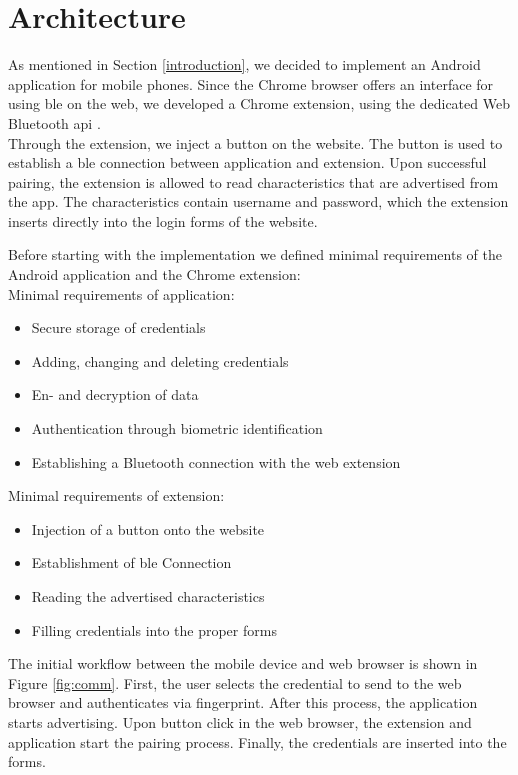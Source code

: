 \section{Architecture} \label{architecture}
As mentioned in Section \ref{introduction}, we decided to implement an Android application for mobile phones. Since the Chrome browser offers an interface for using \gls{ble} on the web, we developed a Chrome extension, using the dedicated Web Bluetooth \gls{api} \cite{WebBTAPI}. \\
Through the extension, we inject a button on the website. The button is used to establish a \gls{ble} connection between application and extension. Upon successful pairing, the extension is allowed to read characteristics that are advertised from the app. The characteristics contain username and password, which the extension inserts directly into the login forms of the website.

\noindent Before starting with the implementation we defined minimal requirements of the Android application and the Chrome extension: \\

\noindent Minimal requirements of application:
\begin{itemize}
\item Secure storage of credentials
\item Adding, changing and deleting credentials
\item En- and decryption of data 
\item Authentication through biometric identification
\item Establishing a Bluetooth connection with the web extension
\end{itemize}
\vspace{0.3cm}
\noindent Minimal requirements of extension:
\begin{itemize}
\item Injection of a button onto the website
\item Establishment of \gls{ble} Connection
\item Reading the advertised characteristics
\item Filling credentials into the proper forms
\end{itemize}

The initial workflow between the mobile device and web browser is shown in Figure \ref{fig:comm}. First, the user selects the credential to send to the web browser and authenticates via fingerprint. After this process, the application starts advertising. Upon button click in the web browser, the extension and application start the pairing process. Finally, the credentials are inserted into the forms. \\


